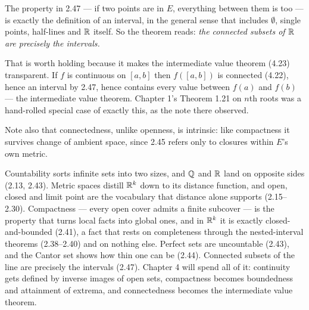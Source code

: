 \begin{center}
\end{center}

\begin{unpack}
The property in 2.47 --- if two points are in $E$, everything between them is
too --- is exactly the definition of an interval, in the general sense that
includes $\emptyset$, single points, half-lines and $\mathbb{R}$ itself. So the theorem
reads: \emph{the connected subsets of $\mathbb{R}$ are precisely the intervals.}

\smallskip
That is worth holding because it makes the intermediate value theorem
(4.23) transparent. If $f$ is continuous
on $[a,b]$ then $f([a,b])$ is connected (4.22), hence an interval by 2.47,
hence contains every value between $f(a)$ and $f(b)$ --- the intermediate value
theorem. Chapter 1's Theorem 1.21 on $n$th roots was a hand-rolled special case
of exactly this, as the note there observed.

\smallskip
Note also that connectedness, unlike openness, is intrinsic: like compactness
it survives change of ambient space, since 2.45 refers only to closures within
$E$'s own metric.
\end{unpack}

\begin{recap}
Countability sorts infinite sets into two sizes, and $\mathbb{Q}$ and $\mathbb{R}$ land on
opposite sides (2.13, 2.43). Metric spaces distill $\mathbb{R}^k$ down to its distance
function, and open, closed and limit point are the vocabulary that distance
alone supports (2.15--2.30). Compactness --- every open cover admits a finite
subcover --- is the property that turns local facts into global ones, and in
$\mathbb{R}^k$ it is exactly closed-and-bounded (2.41), a fact that rests on
completeness through the nested-interval theorems (2.38--2.40) and on nothing
else. Perfect sets are uncountable (2.43), and the Cantor set shows how thin
one can be (2.44). Connected subsets of the line are precisely the intervals
(2.47). Chapter 4 will spend all of it: continuity gets defined by inverse
images of open sets, compactness becomes boundedness and attainment of extrema,
and connectedness becomes the intermediate value theorem.
\end{recap}
